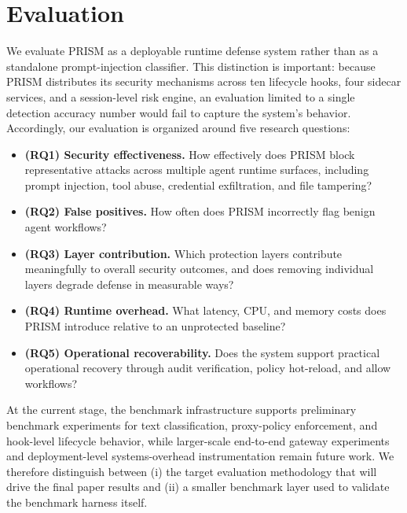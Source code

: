 \section{Evaluation}

We evaluate PRISM as a deployable runtime defense system rather than as a standalone prompt-injection classifier. This distinction is important: because PRISM distributes its security mechanisms across ten lifecycle hooks, four sidecar services, and a session-level risk engine, an evaluation limited to a single detection accuracy number would fail to capture the system's behavior. Accordingly, our evaluation is organized around five research questions:

\begin{itemize}[leftmargin=1.5em]
  \item \textbf{(RQ1) Security effectiveness.} How effectively does PRISM block representative attacks across multiple agent runtime surfaces, including prompt injection, tool abuse, credential exfiltration, and file tampering?
  \item \textbf{(RQ2) False positives.} How often does PRISM incorrectly flag benign agent workflows?
  \item \textbf{(RQ3) Layer contribution.} Which protection layers contribute meaningfully to overall security outcomes, and does removing individual layers degrade defense in measurable ways?
  \item \textbf{(RQ4) Runtime overhead.} What latency, CPU, and memory costs does PRISM introduce relative to an unprotected baseline?
  \item \textbf{(RQ5) Operational recoverability.} Does the system support practical operational recovery through audit verification, policy hot-reload, and allow workflows?
\end{itemize}

At the current stage, the benchmark infrastructure supports preliminary benchmark experiments for text classification, proxy-policy enforcement, and hook-level lifecycle behavior, while larger-scale end-to-end gateway experiments and deployment-level systems-overhead instrumentation remain future work. We therefore distinguish between (i) the target evaluation methodology that will drive the final paper results and (ii) a smaller benchmark layer used to validate the benchmark harness itself.

